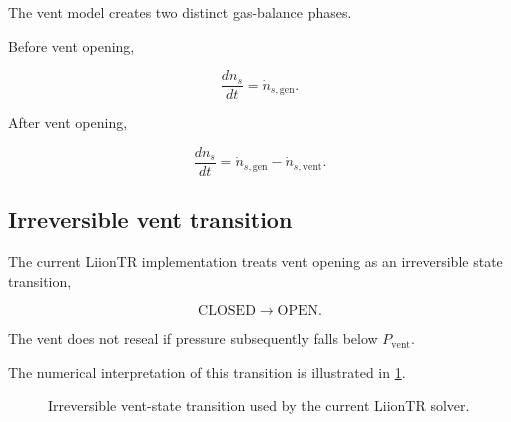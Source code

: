 The vent model creates two distinct gas-balance phases.

Before vent opening,

\begin{equation}
    \frac{dn_s}{dt}
    =
    \dot{n}_{s,\mathrm{gen}}.
    \label{eq:vent_closed_phase}
\end{equation}

After vent opening,

\begin{equation}
    \frac{dn_s}{dt}
    =
    \dot{n}_{s,\mathrm{gen}}
    -
    \dot{n}_{s,\mathrm{vent}}.
    \label{eq:vent_open_phase}
\end{equation}


\subsection{Irreversible vent transition}

The current LiionTR implementation treats vent opening as an irreversible
state transition,

\begin{equation}
    \mathrm{CLOSED}
    \longrightarrow
    \mathrm{OPEN}.
\end{equation}

The vent does not reseal if pressure subsequently falls below
$P_{\mathrm{vent}}$.

The numerical interpretation of this transition is illustrated in
\cref{fig:vent_state_machine}.

\begin{figure}[htbp]
    \centering


    \caption{
        Irreversible vent-state transition used by the current LiionTR
        solver.
    }
    \label{fig:vent_state_machine}
\end{figure}



